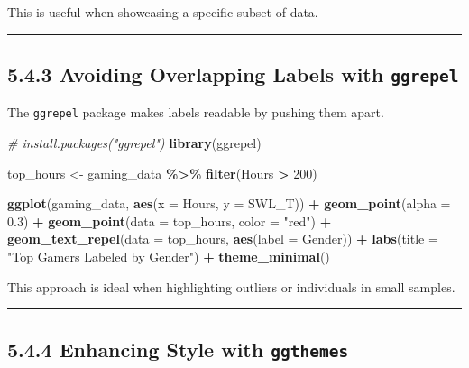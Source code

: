 \documentclass[
]{book}
\newenvironment{Shaded}{\begin{snugshade}}{\end{snugshade}}
\newcommand{\AttributeTok}[1]{\textcolor[rgb]{0.13,0.29,0.53}{#1}}
\newcommand{\CommentTok}[1]{\textcolor[rgb]{0.56,0.35,0.01}{\textit{#1}}}
\newcommand{\DecValTok}[1]{\textcolor[rgb]{0.00,0.00,0.81}{#1}}
\newcommand{\FloatTok}[1]{\textcolor[rgb]{0.00,0.00,0.81}{#1}}
\newcommand{\FunctionTok}[1]{\textcolor[rgb]{0.13,0.29,0.53}{\textbf{#1}}}
\newcommand{\NormalTok}[1]{#1}
\newcommand{\OtherTok}[1]{\textcolor[rgb]{0.56,0.35,0.01}{#1}}
\newcommand{\SpecialCharTok}[1]{\textcolor[rgb]{0.81,0.36,0.00}{\textbf{#1}}}
\newcommand{\StringTok}[1]{\textcolor[rgb]{0.31,0.60,0.02}{#1}}
\begin{document}
This is useful when showcasing a specific subset of data.

\begin{center}\rule{0.5\linewidth}{0.5pt}\end{center}

\subsection{\texorpdfstring{5.4.3 Avoiding Overlapping Labels with \texttt{ggrepel}}{5.4.3 Avoiding Overlapping Labels with ggrepel}}\label{avoiding-overlapping-labels-with-ggrepel}

The \texttt{ggrepel} package makes labels readable by pushing them apart.

\begin{Shaded}
\begin{Highlighting}[]
\CommentTok{\# install.packages("ggrepel")}
\FunctionTok{library}\NormalTok{(ggrepel)}

\NormalTok{top\_hours }\OtherTok{\textless{}{-}}\NormalTok{ gaming\_data }\SpecialCharTok{\%\textgreater{}\%}
  \FunctionTok{filter}\NormalTok{(Hours }\SpecialCharTok{\textgreater{}} \DecValTok{200}\NormalTok{)}

\FunctionTok{ggplot}\NormalTok{(gaming\_data, }\FunctionTok{aes}\NormalTok{(}\AttributeTok{x =}\NormalTok{ Hours, }\AttributeTok{y =}\NormalTok{ SWL\_T)) }\SpecialCharTok{+}
  \FunctionTok{geom\_point}\NormalTok{(}\AttributeTok{alpha =} \FloatTok{0.3}\NormalTok{) }\SpecialCharTok{+}
  \FunctionTok{geom\_point}\NormalTok{(}\AttributeTok{data =}\NormalTok{ top\_hours, }\AttributeTok{color =} \StringTok{"red"}\NormalTok{) }\SpecialCharTok{+}
  \FunctionTok{geom\_text\_repel}\NormalTok{(}\AttributeTok{data =}\NormalTok{ top\_hours, }\FunctionTok{aes}\NormalTok{(}\AttributeTok{label =}\NormalTok{ Gender)) }\SpecialCharTok{+}
  \FunctionTok{labs}\NormalTok{(}\AttributeTok{title =} \StringTok{"Top Gamers Labeled by Gender"}\NormalTok{) }\SpecialCharTok{+}
  \FunctionTok{theme\_minimal}\NormalTok{()}
\end{Highlighting}
\end{Shaded}

This approach is ideal when highlighting outliers or individuals in small samples.

\begin{center}\rule{0.5\linewidth}{0.5pt}\end{center}

\subsection{\texorpdfstring{5.4.4 Enhancing Style with \texttt{ggthemes}}{5.4.4 Enhancing Style with ggthemes}}\label{enhancing-style-with-ggthemes}
\end{document}
